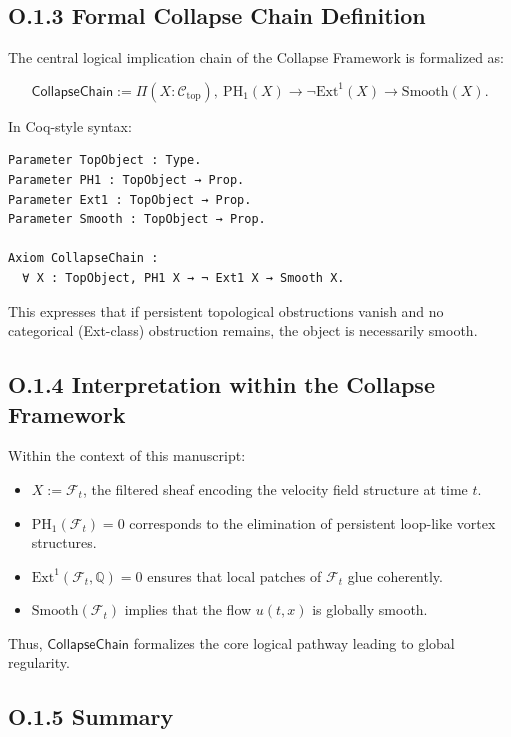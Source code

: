 \documentclass[11pt]{article}
\begin{document}
\subsection*{O.1.3 Formal Collapse Chain Definition}

The central logical implication chain of the Collapse Framework is formalized as:

\[
\textsf{CollapseChain} :=
\Pi (X : \mathcal{C}_{\mathrm{top}}),\ 
\mathrm{PH}_1(X) \rightarrow \neg \mathrm{Ext}^1(X) \rightarrow \mathrm{Smooth}(X).
\]

In Coq-style syntax:

\begin{lstlisting}[language=Coq]
Parameter TopObject : Type.
Parameter PH1 : TopObject → Prop.
Parameter Ext1 : TopObject → Prop.
Parameter Smooth : TopObject → Prop.

Axiom CollapseChain :
  ∀ X : TopObject, PH1 X → ¬ Ext1 X → Smooth X.
\end{lstlisting}

This expresses that if persistent topological obstructions vanish and no categorical (Ext-class) obstruction remains, the object is necessarily smooth.

\subsection*{O.1.4 Interpretation within the Collapse Framework}

Within the context of this manuscript:

\begin{itemize}
  \item \( X := \mathcal{F}_t \), the filtered sheaf encoding the velocity field structure at time \( t \).
  \item \( \mathrm{PH}_1(\mathcal{F}_t) = 0 \) corresponds to the elimination of persistent loop-like vortex structures.
  \item \( \mathrm{Ext}^1(\mathcal{F}_t, \mathbb{Q}) = 0 \) ensures that local patches of \( \mathcal{F}_t \) glue coherently.
  \item \( \mathrm{Smooth}(\mathcal{F}_t) \) implies that the flow \( u(t, x) \) is globally smooth.
\end{itemize}

Thus, \( \textsf{CollapseChain} \) formalizes the core logical pathway leading to global regularity.

\subsection*{O.1.5 Summary}
\end{document}
